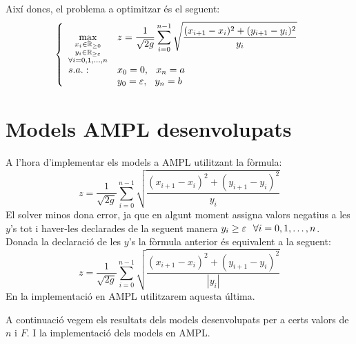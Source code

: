 \documentclass[10pt]{extarticle}
\begin{document}
Així doncs, el problema a optimitzar és el seguent:
\begin{equation*}
    \left\{
    \begin{array}{ll}
        \displaystyle{\max\limits_{\substack{x_i \in \mathbb{R}_{\ge0} \\ y_i \in \mathbb{R}_{\ge\varepsilon} \\ \forall i = 0,1,\hdots,n}}} & \displaystyle{z = \frac{1}{\sqrt{2g}} \sum_{i = 0}^{n-1} \sqrt{\frac{(x_{i+1}-x_i)^2+(y_{i+1}-y_i)^2}{y_i}}} \\
        s.a.: & \displaystyle{x_0} = 0, \hspace{.25cm} \displaystyle{x_n} = a \\
        & \displaystyle{y_0} = \varepsilon, \hspace{.25cm} \displaystyle{y_n} = b \\
    \end{array}
    \right.
\end{equation*}

\newpage
\section{Models AMPL desenvolupats}
A l'hora d'implementar els models a AMPL utilitzant la fòrmula:
$$z = \frac{1}{\sqrt{2g}} \sum_{i = 0}^{n-1} \sqrt{\frac{(x_{i+1}-x_i)^2+(y_{i+1}-y_i)^2}{y_i}}$$
El solver minos dona error, ja que en algunt moment assigna valors negatius a les $y$'s tot i haver-les declarades de la seguent manera $y_i \ge \varepsilon \hspace{.25cm} \forall i = 0,1,\hdots,n$. Donada la declaració de les $y$'s la fòrmula anterior és equivalent a la seguent:
$$z = \frac{1}{\sqrt{2g}} \sum_{i = 0}^{n-1} \sqrt{\frac{(x_{i+1}-x_i)^2+(y_{i+1}-y_i)^2}{|y_i|}}$$
En la implementació en AMPL utilitzarem aquesta última. \vspace{.25cm}

A continuació vegem els resultats dels models desenvolupats per a certs valors de $n$ i $F$. I la implementació dels models en AMPL.
\end{document}
